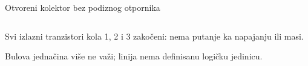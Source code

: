\begin{frame}[label=10-s036]{Otvoreni kolektor bez podiznog otpornika}
\setlength{\abovedisplayskip}{4pt}\setlength{\belowdisplayskip}{4pt}\setlength{\abovedisplayshortskip}{3pt}\setlength{\belowdisplayshortskip}{3pt}
\medskip
\begin{columns}[c,onlytextwidth]\centering{}\centering\end{columns}\medskip
Svi izlazni tranzistori kola 1, 2 i 3 zakočeni: nema putanje ka napajanju ili masi.\par
Bulova jednačina više ne važi; linija nema definisanu logičku jedinicu.
\end{frame}
